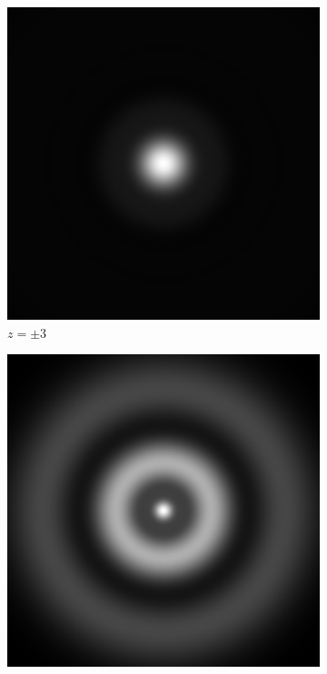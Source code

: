 \documentclass[11pt, a4paper, twoside]{article} %
\begin{document}
\begin{figure}[h!] 
     \centering 
    \begin{subfigure}[b]{0.245\linewidth}
    \includegraphics[width=\linewidth]{simul599.png}
    \caption{$z=\pm3$}
     \end{subfigure}
 \begin{subfigure}[b]{0.245\linewidth}
     \includegraphics[width=\linewidth]{simul5990.png}

\end{subfigure}
\end{figure}
\end{document}
